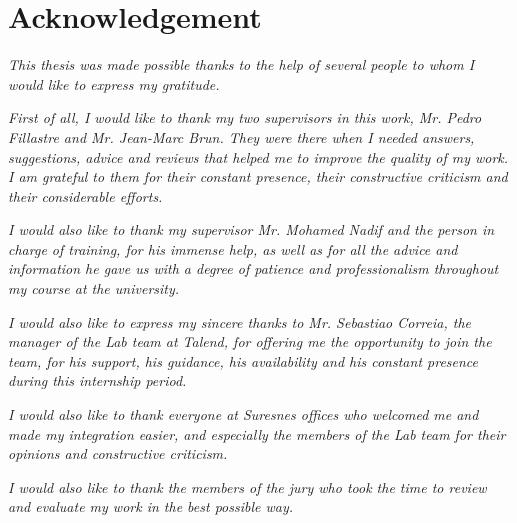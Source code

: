 \chapter*{Acknowledgement}
\thispagestyle{empty}


\vspace{0.75cm}
\textit{This thesis was made possible thanks to the help of several people to whom I would like to express my gratitude.}
\vspace{0.75cm}

\textit{ First of all, I would like to thank my two supervisors in this work, Mr. Pedro Fillastre and Mr. Jean-Marc Brun. They were there when I needed answers, suggestions, advice and reviews that helped me to improve the quality of my work. I am grateful to them for their constant presence, their constructive criticism and their considerable efforts.}

\vspace{0.75cm}

\textit{I would also like to thank my supervisor Mr. Mohamed Nadif and the person in charge of training, for his immense help, as well as for all the advice and information he gave us with a degree of patience and professionalism throughout my course at the university.}
\vspace{0.75cm}


\textit{I would also like to express my sincere thanks to Mr. Sebastiao Correia, the manager of the Lab team at Talend, for offering me the opportunity to join the team, for his support, his guidance, his availability and his constant presence during this internship period.}
\vspace{0.75cm}


\textit{I would also like to thank everyone at Suresnes offices who welcomed me and made my integration easier, and especially the members of the Lab team for their opinions and constructive criticism.}
\vspace{0.75cm}


\textit{I would also like to thank the members of the jury who took the time to review and evaluate my work in the best possible way.}

